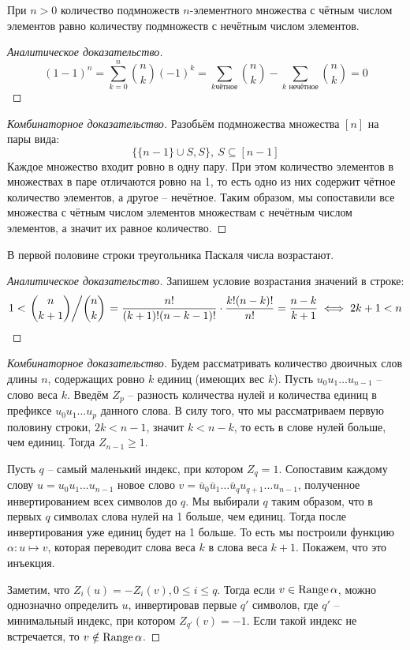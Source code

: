 \documentclass[12pt]{article}
\begin{document}
\begin{statement}
	При $n>0$ количество подмножеств $n$-элементного множества с чётным
	числом элементов равно количеству подмножеств с нечётным числом элементов.
	\begin{proof}[Аналитическое доказательство]
		\[(1-1)^n=\sum_{k=0}^{n}\binom{n}{k}(-1)^k=\sum_{k\text{
		чётное}}\binom{n}{k}-\sum_{k\text{ нечётное}}\binom{n}{k}=0\]	
	\end{proof}
	\begin{proof}[Комбинаторное доказательство]
		Разобьём подмножества множества $[n]$ на пары вида:
		\[\{\{n-1\}\cup S, S\},\ S\subseteq [n-1]\]		Каждое множество
		входит ровно в одну пару. При этом количество
		элементов в множествах в паре отличаются ровно на 1, то есть одно
		из них содержит чётное количество элементов, а другое -- нечётное.
		Таким образом, мы сопоставили все множества с чётным
		числом элементов множествам с нечётным числом элементов, а значит
		их равное количество.
	\end{proof}
\end{statement}
\begin{statement}\label{Числа в треугольнике Паскаля возрастают к середине}
	В первой половине строки треугольника Паскаля числа возрастают.
	\begin{proof}[Аналитическое доказательство]
		Запишем условие возрастания значений в строке:
		\[1<\left.\binom{n}{k+1}\middle/\binom{n}{k}\right.=\frac{n!}{(k+1)!(n-k-1)!}\cdot
		\frac{k!(n-k)!}{n!}=\frac{n-k}{k+1}\iff 2k+1<n\]	
	\end{proof}
	\begin{proof}[Комбинаторное доказательство]
		Будем рассматривать количество двоичных слов длины $n$, содержащих
		ровно $k$ единиц (имеющих вес $k$). Пусть $u_0u_1\ldots u_{n-1}$ --
		слово веса $k$. Введём $Z_p$ -- разность количества нулей и
		количества единиц в префиксе $u_0u_1\ldots u_p$ данного слова. В
		силу того, что мы рассматриваем первую половину строки, $2k<n-1$,
		значит $k<n-k$, то есть в слове нулей больше, чем единиц. Тогда
		$Z_{n-1}\geqslant 1$.\par

		Пусть $q$ -- самый маленький индекс, при котором $Z_q=1$.
		Сопоставим каждому слову $u=u_0u_1\ldots u_{n-1}$ новое слово
		$v=\bar{u}_0\bar{u}_1\ldots \bar{u}_qu_{q+1}\ldots u_{n-1}$,
		полученное инвертированием всех символов до $q$. Мы выбирали $q$
		таким образом, что в первых $q$ символах слова нулей на 1 больше,
		чем единиц. Тогда после инвертирования уже единиц будет на 1
		больше. То есть мы построили функцию $\alpha\colon u\mapsto v$,
		которая переводит слова веса $k$ в слова веса $k+1$. Покажем, что
		это инъекция.\par

		Заметим, что $Z_i(u)=-Z_i(v), 0\leqslant i \leqslant q$. Тогда если $v\in
		\operatorname{Range} \alpha$, можно однозначно определить $u$, инвертировав
		первые $q'$ символов, где $q'$ -- минимальный индекс, при котором
		$Z_{q'}(v)=-1$. Если такой индекс не встречается, то $v\notin \operatorname{Range} \alpha$.
	\end{proof}
\end{statement}
\end{document}
